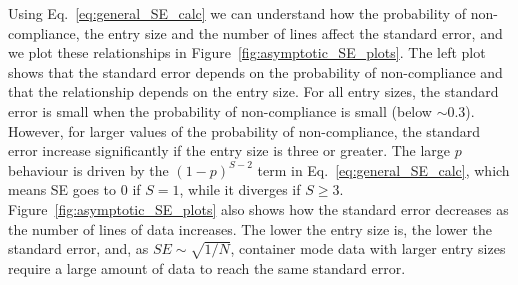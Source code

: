 \documentclass[aoas]{imsart}
\begin{document}
Using Eq.~\eqref{eq:general_SE_calc} we can understand how the probability of non-compliance, the entry size and the number of lines affect the standard error, and we plot these relationships in Figure~\ref{fig:asymptotic_SE_plots}. The left plot shows that the standard error depends on the probability of non-compliance and that the relationship depends on the entry size. For all entry sizes, the standard error is small when the probability of non-compliance is small (below \(\sim 0.3\)). However, for larger values of the probability of non-compliance, the standard error increase significantly if the entry size is three or greater. The large \(p\) behaviour is driven by the \((1-p)^{S-2}\) term in Eq.~\eqref{eq:general_SE_calc}, which means SE goes to 0 if \(S=1\), while it diverges if \(S\geq 3\). Figure~\ref{fig:asymptotic_SE_plots} also shows how the standard error decreases as the number of lines of data increases. The lower the entry size is, the lower the standard error, and, as \(SE\sim\sqrt{1/N}\), 
container mode data with larger entry sizes require a large amount of data to reach the same standard error. 
\end{document}

